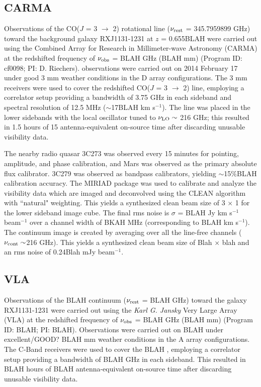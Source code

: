 \documentclass[]{emulateapj}
\begin{document}
\subsection{CARMA} \label{sec:carmadata}
%
Observations of the CO($J$ = 3 $\rightarrow$ 2) rotational line ($\nu_{\rm rest}$ = 345.7959899 GHz) toward the background galaxy RXJ1131-1231 at $z$ = 
0.655BLAH 
 were carried out using the Combined Array for Research in Millimeter-wave Astronomy (CARMA) at the redshifted frequency of $\nu_{\rm obs}$ = BLAH GHz (BLAH mm) (Program ID: cf0098; PI: D. Riechers).
observations were carried out on 2014 February 17 under good 3 mm weather conditions in the D array configurations. The 3 mm receivers were used to cover the redshifted CO($J$ = 3 $\rightarrow$ 2) line, employing a correlator setup providing a bandwidth of 3.75 GHz in each sideband and spectral resolution of 12.5 MHz ($\sim$17BLAH km s$^{-1}$). The line was placed in the
lower sidebands with the local oscillator tuned to $\nu_{\rm LO}\sim$ 216 GHz; this resulted in 1.5 hours of 15 antenna-equivalent on-source time after discarding unusable visibility data. 

The nearby radio quasar 3C273 was observed every 15 minutes for
pointing, amplitude, and phase calibration, and Mars was observed as the primary
absolute flux calibrator. 3C279 was observed as bandpass calibrators, yielding $\sim
$15\%BLAH calibration accuracy.
The MIRIAD package was used to calibrate and analyze the visibility data which are imaged and deconvolved using
the CLEAN algorithm with ``natural" weighting. This yields a synthesized clean beam size of 3 $\times$ 1 for the lower sideband image cube. The final rms noise is $\sigma$ = BLAH Jy km s$^{-1}$ beam$^{-1}$ over a channel width of BKAH MHz (corresponding to BLAH km s$^{-1}$). 
The continuum image is created by
averaging over all the line-free channels ($\nu_{\rm cont}\sim$216 GHz). This yields a synthesized clean beam size of Blah $\times$ blah and an rms noise of 0.24Blah mJy beam$^{-1}$.

\subsection{VLA} 
Observations of the BLAH continuum ($\nu_{\rm rest}$ = BLAH GHz) toward the galaxy RXJ1131-1231 were carried out using the {\it Karl G. Jansky} Very Large Array (VLA) at the redshifted frequency of $\nu_{\rm obs}$ = BLAH GHz (BLAH mm) (Program ID: BLAH; PI: BLAH).
Observations were carried out on BLAH under excellent/GOOD? BLAH mm weather conditions in the A array configurations. The C-Band receivers were used to cover the BLAH
, employing a correlator setup providing a bandwidth of BLAH GHz in each sideband. This resulted in BLAH hours of BLAH antenna-equivalent on-source time after discarding unusable visibility data.
\end{document}
